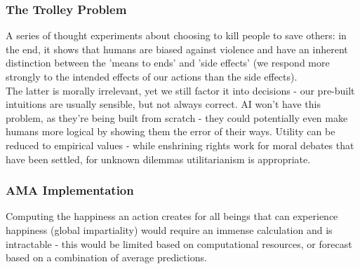 \subsubsection{The Trolley Problem}
A series of thought experiments about choosing to kill people to save others: in the end, it shows that humans are biased against violence and have an inherent distinction between the 'means to ends' and 'side effects' (we respond more strongly to the intended effects of our actions than the side effects). \\

The latter is morally irrelevant, yet we still factor it into decisions - our pre-built intuitions are usually sensible, but not always correct. AI won't have this problem, as they're being built from scratch - they could potentially even make humans more logical by showing them the error of their ways. Utility can be  reduced to empirical values - while enshrining rights work for moral debates that have been settled, for unknown dilemmas utilitarianism is appropriate.

\subsubsection{AMA Implementation}
Computing the happiness an action creates for all beings that can experience happiness (global impartiality) would require an immense calculation and is intractable - this would be limited based on computational resources,  or forecast based on a combination of average predictions. 